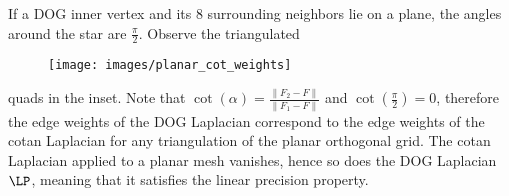 If a DOG inner vertex and its 8 surrounding neighbors lie on a plane, the angles around the star are $\frac{\pi}{2}$. Observe the triangulated 
%
\setlength{\intextsep}{1pt}%
\setlength{\columnsep}{8pt}%
\begin{wrapfigure}{r}{0.3\columnwidth}
        \centering
        \texttt{[image: images/planar\_cot\_weights]}
\end{wrapfigure}
%
quads in the inset. Note that $\cot(\alpha) = \frac{\|F_2-F\|}{\|F_1-F\|}$ and $\cot(\frac{\pi}{2})=0$, therefore the edge weights of the DOG Laplacian correspond to the edge weights of the cotan Laplacian \cite{cot_pink_polth} for any triangulation of the planar orthogonal grid. The cotan Laplacian applied to a planar mesh vanishes, hence so does the DOG Laplacian $\LP$, meaning that it satisfies the linear precision property.


